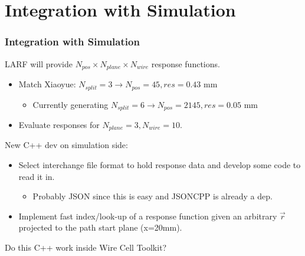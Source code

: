 \documentclass[xcolor=dvipsnames]{beamer}
\begin{document}
\section{Integration with Simulation}

\begin{frame}
  \frametitle{Integration with Simulation}
  LARF will provide $N_{pos} \times N_{plane} \times N_{wire}$ response functions.
  \begin{itemize}
  \item Match Xiaoyue: $N_{split} = 3 \to N_{pos} = 45, res = 0.43$ mm
    \begin{itemize}\footnotesize
    \item Currently generating $N_{split} = 6 \to N_{pos} = 2145, res = 0.05$ mm
    \end{itemize}
  \item Evaluate responses for $N_{plane} = 3, N_{wire} = 10$.
  \end{itemize}

  \vfill

  New C++ dev on simulation side:
  \begin{itemize}
  \item Select interchange file format to hold response data and
    develop some code to read it in.
    \begin{itemize}\footnotesize
    \item Probably JSON since this is easy and JSONCPP is already a dep.
    \end{itemize}
  \item Implement fast index/look-up of a response function given an
    arbitrary $\vec{r}$ projected to the path start plane (x=20mm).
  \end{itemize}

  \vfill

  Do this C++ work inside Wire Cell Toolkit?

\end{frame}
\end{document}
